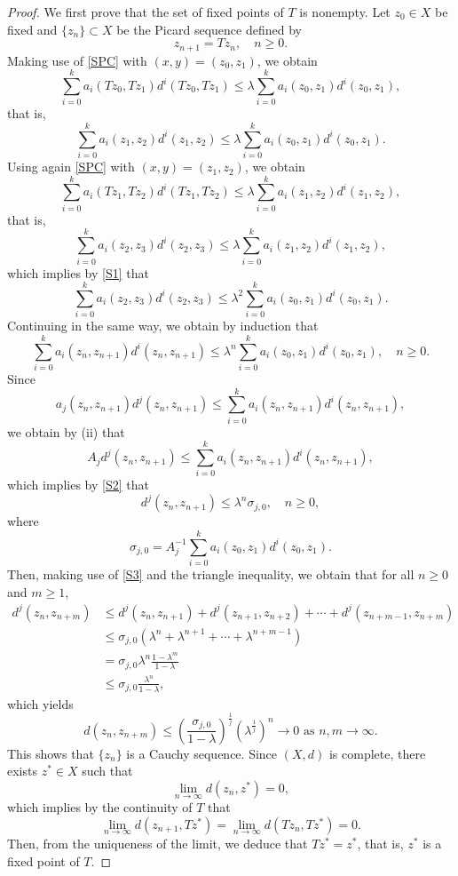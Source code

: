 \documentclass[letterpaper,12pt]{article}
\numberwithin{equation}{section}
\theoremstyle{definition}
\theoremstyle{remark}
\begin{document}
\begin{proof}
We first prove that the set of fixed points of $T$ is nonempty.  Let $z_0\in X$ be fixed and  $\{z_n\}\subset X$ be the Picard sequence defined by  
$$
z_{n+1}=Tz_n,\quad  n\geq 0.
$$
Making use of \eqref{SPC} with $(x,y)=(z_0,z_1)$, we obtain
$$
\sum_{i=0}^ka_i(Tz_0,Tz_1)d^i(Tz_0,Tz_1)\leq \lambda \sum_{i=0}^k a_i(z_0,z_1)d^i(z_0,z_1),
$$
that is,
\begin{equation}\label{S1}
\sum_{i=0}^ka_i(z_1,z_2)d^i(z_1,z_2)\leq \lambda \sum_{i=0}^k a_i(z_0,z_1)d^i(z_0,z_1).
\end{equation}
Using again \eqref{SPC} with $(x,y)=(z_1,z_2)$, we obtain
$$
\sum_{i=0}^ka_i(Tz_1,Tz_2)d^i(Tz_1,Tz_2)\leq \lambda \sum_{i=0}^k a_i(z_1,z_2)d^i(z_1,z_2),
$$
that is,
$$
\sum_{i=0}^ka_i(z_2,z_3)d^i(z_2,z_3)\leq \lambda \sum_{i=0}^k a_i(z_1,z_2)d^i(z_1,z_2),
$$
which implies by \eqref{S1} that 
$$
\sum_{i=0}^ka_i(z_2,z_3)d^i(z_2,z_3)\leq \lambda^2 \sum_{i=0}^k a_i(z_0,z_1)d^i(z_0,z_1). 
$$
Continuing in the same way, we obtain by induction that   
\begin{equation}\label{S2}
\sum_{i=0}^ka_i(z_n,z_{n+1})d^i(z_n,z_{n+1})\leq \lambda^n \sum_{i=0}^k a_i(z_0,z_1)d^i(z_0,z_1),\quad n\geq 0.  	
\end{equation}
Since 
$$
a_j(z_n,z_{n+1})d^j(z_n,z_{n+1})\leq \sum_{i=0}^ka_i(z_n,z_{n+1})d^i(z_n,z_{n+1}),
$$
we obtain by (ii) that 
$$
A_j d^j(z_n,z_{n+1})\leq \sum_{i=0}^ka_i(z_n,z_{n+1})d^i(z_n,z_{n+1}),
$$
which implies by \eqref{S2} that 
\begin{equation}\label{S3}
d^j(z_n,z_{n+1})\leq  \lambda^n \sigma_{j,0},\quad n\geq 0,	
\end{equation}
where 
\begin{equation}\label{sigma0}
\sigma_{j,0}=A_j^{-1}\sum_{i=0}^k a_i(z_0,z_1)d^i(z_0,z_1).
\end{equation}
Then, making use of \eqref{S3} and the triangle inequality, we obtain that for all $n\geq 0$ and $m\geq 1$,
$$
\begin{aligned}
d^j(z_n,z_{n+m})&\leq d^j(z_n,z_{n+1})+d^j(z_{n+1},z_{n+2})+\cdots+d^j(z_{n+m-1},z_{n+m})\\
&\leq \sigma_{j,0}\left(	\lambda^n+\lambda^{n+1}+\cdots+\lambda^{n+m-1}\right)\\
&=\sigma_{j,0} \lambda^n \frac{1-\lambda^{m}}{1-\lambda}\\
&\leq \sigma_{j,0}  \frac{\lambda^n}{1-\lambda},
\end{aligned}
$$
which yields
$$
d(z_n,z_{n+m})\leq \left(\frac{\sigma_{j,0} }{1-\lambda}\right)^{\frac{1}{j}} (\lambda^{\frac{1}{j}})^n\to 0\mbox{ as }n,m\to \infty.
$$
This shows that $\{z_n\}$ is a Cauchy sequence. Since $(X,d)$ is complete, there exists $z^*\in X$ such that 
$$
\lim_{n\to \infty}d(z_n,z^*)=0,
$$
which implies by the continuity of $T$ that 
$$
\lim_{n\to \infty}d(z_{n+1},Tz^*)=\lim_{n\to \infty}d(Tz_n,Tz^*)=0.
$$
Then, from the uniqueness of the limit, we deduce that $Tz^*=z^*$, that is, $z^*$ is a fixed point of $T$. 


\end{proof}
\end{document}
